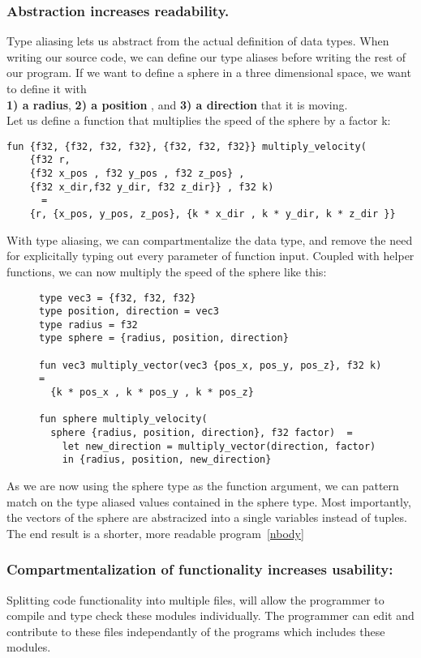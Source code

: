 \subsubsection{Abstraction increases readability.} 
Type aliasing lets us abstract
from the actual definition of data types.
When writing our source code, we can define our type aliases before writing the
rest of our program.
If we want to define a sphere in a three dimensional space, we want to define it
with \\
\textbf{1) a radius}, \textbf{2) a position} , and \textbf{3) a direction} that it is
moving.\\
Let us define a function that multiplies the speed of the sphere by a factor k:
\begin{lstlisting}
fun {f32, {f32, f32, f32}, {f32, f32, f32}} multiply_velocity(
	{f32 r, 
	{f32 x_pos , f32 y_pos , f32 z_pos} , 
	{f32 x_dir,f32 y_dir, f32 z_dir}} , f32 k) 
	  =
    {r, {x_pos, y_pos, z_pos}, {k * x_dir , k * y_dir, k * z_dir }}
\end{lstlisting}
\noindent
With type aliasing, we can compartmentalize the data type, and remove the need
for explicitally typing out every parameter of function input.
Coupled with helper functions, we can now multiply the speed of the sphere like
this:
\begin{figure}[h]
\begin{verbatim}
type vec3 = {f32, f32, f32}
type position, direction = vec3 
type radius = f32
type sphere = {radius, position, direction}

fun vec3 multiply_vector(vec3 {pos_x, pos_y, pos_z}, f32 k) =
  {k * pos_x , k * pos_y , k * pos_z}

fun sphere multiply_velocity(
  sphere {radius, position, direction}, f32 factor)  =
    let new_direction = multiply_vector(direction, factor)
    in {radius, position, new_direction}
\end{verbatim}
\end{figure}

\noindent As we are now using the sphere type as the function argument, we can pattern
match on the type aliased values contained in the sphere type.
Most importantly, the vectors of the sphere are abstracized into a single variables
instead of tuples.
\\
The end result is a shorter, more readable program~\ref{nbody}

\subsubsection{Compartmentalization of functionality increases usability:}
Splitting code functionality into multiple files, will allow the programmer to
compile and type check these modules individually. The programmer can edit and
contribute to these files independantly of the programs which includes these
modules.

